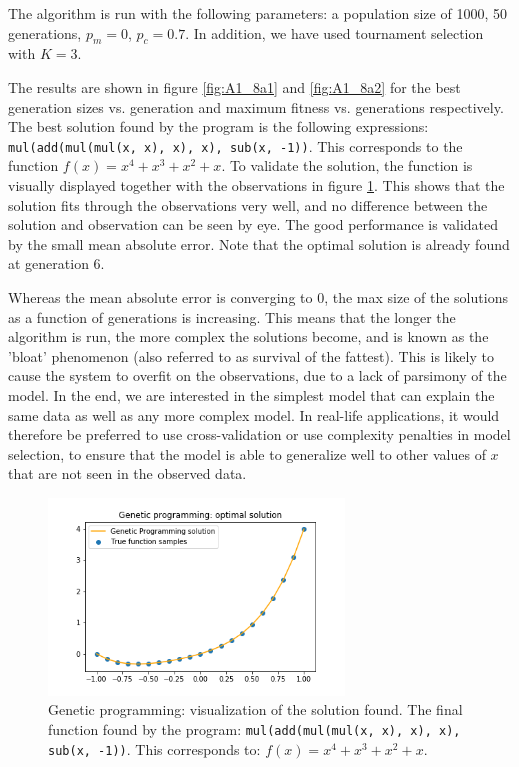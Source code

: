 \documentclass{article}
\begin{document}
The algorithm is run with the following parameters: a population size of 1000, 50 generations, $p_m = 0$, $p_c = 0.7$. In addition, we have used tournament selection with $K=3$. 

The results are shown in figure \ref{fig:A1_8a1} and \ref{fig:A1_8a2} for the best generation sizes vs. generation and maximum fitness vs. generations respectively. The best solution found by the program is the following expressions: \texttt{mul(add(mul(mul(x, x), x), x), sub(x, -1))}. This corresponds to the function $f(x) = x^4+x^3+x^2+x$. To validate the solution, the function is visually displayed together with the observations in figure \ref{fig:A1_8a3}. This shows that the solution fits through the observations very well, and no difference between the solution and observation can be seen by eye. The good performance is validated by the small mean absolute error. Note that the optimal solution is already found at generation 6. 

Whereas the mean absolute error is converging to 0, the max size of the solutions as a function of generations is increasing. This means that the longer the algorithm is run, the more complex the solutions become, and is known as the 'bloat' phenomenon (also referred to as survival of the fattest). This is likely to cause the system to overfit on the observations, due to a lack of parsimony of the model. In the end, we are interested in the simplest model that can explain the same data as well as any more complex model. In real-life applications, it would therefore be preferred to use cross-validation or use complexity penalties in model selection, to ensure that the model is able to generalize well to other values of $x$ that are not seen in the observed data. 

\begin{figure}[H]
    \centering
    \includegraphics[width=0.7\textwidth]{Assignment 1/Figures/A1_8a3.png}
    \caption{Genetic programming: visualization of the solution found. The final function found by the program: \texttt{mul(add(mul(mul(x, x), x), x), sub(x, -1))}. This corresponds to: $f(x) = x^4+x^3+x^2+x$.}
    \label{fig:A1_8a3}
\end{figure}
\end{document}
